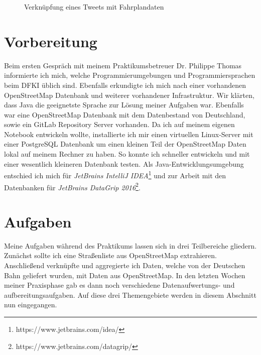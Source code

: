 \begin{figure}
   \centering
   \caption{Verknüpfung eines Tweets mit Fahrplandaten\protect\cite{WEB:SD4M:Presentation:2016}}
   \label{fig:tweetXfahrplan}
 \end{figure}

\section{Vorbereitung}
\label{sec:main:preparation}
Beim ersten Gespräch mit meinem Praktikumsbetreuer Dr. Philippe Thomas informierte ich mich, welche Programmierumgebungen und Programmiersprachen beim DFKI üblich sind.
Ebenfalls erkundigte ich mich nach einer vorhandenen OpenStreetMap Datenbank und weiterer vorhandener Infrastruktur.
Wir klärten, dass Java die geeignetste Sprache zur Lösung meiner Aufgaben war. 
Ebenfalls war eine OpenStreetMap Datenbank mit dem Datenbestand von Deutschland, sowie ein GitLab Repository Server vorhanden.
Da ich auf meinem eigenen Notebook entwickeln wollte, installierte ich mir einen virtuellen Linux-Server mit einer PostgreSQL Datenbank um einen kleinen Teil der OpenStreetMap Daten lokal auf meinem Rechner zu haben.
So konnte ich schneller entwickeln und mit einer wesentlich kleineren Datenbank testen.
Als Java-Entwicklungsumgebung entschied ich mich für \textit{JetBrains IntelliJ IDEA}\footnote{https://www.jetbrains.com/idea/} und zur Arbeit mit den Datenbanken für \textit{JetBrains DataGrip 2016}\footnote{https://www.jetbrains.com/datagrip/}.

\section{Aufgaben}
Meine Aufgaben während des Praktikums lassen sich in drei Teilbereiche gliedern. Zunächst sollte ich eine Straßenliste aus OpenStreetMap extrahieren. Anschließend verknüpfte und aggregierte ich Daten, welche von der Deutschen Bahn geliefert wurden, mit Daten aus OpenStreetMap. In den letzten Wochen meiner Praxisphase gab es dann noch verschiedene Datenaufwertungs- und aufbereitungsaufgaben. Auf diese drei Themengebiete werden in diesem Abschnitt nun eingegangen.

